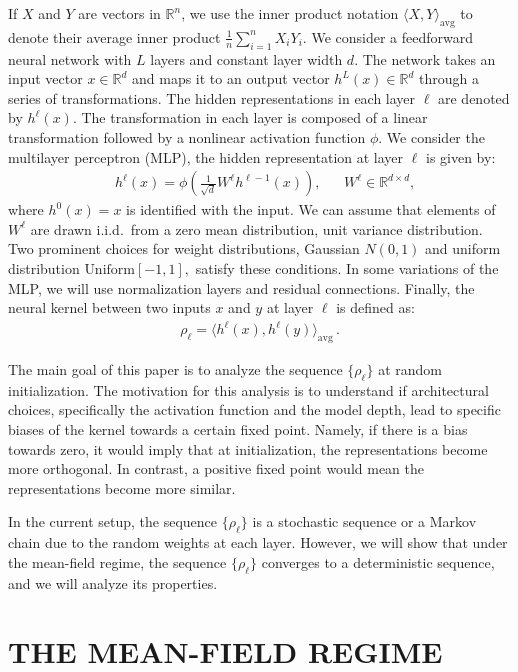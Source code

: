 \documentclass[twoside]{article}
\newcommand{\avg}{\text{avg}}
\newcommand{\R}{\mathbb{R}}
\theoremstyle{definition}
\begin{document}
If $X$ and $Y$ are vectors in $\R^n$, we use the inner product notation $\langle X, Y \rangle_\avg$ to denote their average inner product $\frac{1}{n} \sum_{i=1}^n X_i Y_i.$  We consider a feedforward neural network with $L$ layers and constant layer width $d$. The network takes an input vector $x \in \R^d$ and maps it to an output vector $h^L(x) \in \R^d$ through a series of transformations. The hidden representations in each layer $\ell$ are denoted by $h^\ell(x)$. The transformation in each layer is composed of a linear transformation followed by a nonlinear activation function $\phi$. We consider the multilayer perceptron (MLP), the hidden representation at layer $\ell$ is given by:
\begin{align}
& h^\ell(x) = \phi\left(\frac{1}{\sqrt{d}}W^\ell h^{\ell-1}(x)\right), && W^\ell \in \R^{d \times d},
\end{align}
where $h^0(x)=x$ is identified with the input. We can assume that elements of $W^\ell$ are drawn i.i.d.~from a zero mean distribution, unit variance distribution. Two prominent choices for weight distributions, Gaussian $N(0,1)$ and uniform distribution $\text{Uniform}[-1,1],$ satisfy these conditions. In some variations of the MLP, we will use normalization layers and residual connections. Finally, the neural kernel between two inputs $x$ and $y$ at layer $\ell$ is defined as:
\begin{align}
    \rho_\ell = \langle h^\ell(x), h^\ell(y) \rangle_\avg \,.
\end{align}

The main goal of this paper is to analyze the sequence $\{\rho_\ell\}$ at random initialization. The motivation for this analysis is to understand if architectural choices, specifically the activation function and the model depth, lead to specific biases of the kernel towards a certain fixed point. Namely, if there is a bias towards zero, it would imply that at initialization, the representations become more orthogonal. In contrast, a positive fixed point would mean the representations become more similar.

In the current setup, the sequence $\{\rho_\ell\}$ is a stochastic sequence or a Markov chain due to the random weights at each layer. However, we will show that under the mean-field regime, the sequence $\{\rho_\ell\}$ converges to a deterministic sequence, and we will analyze its properties.


\section{THE MEAN-FIELD REGIME}
\end{document}
